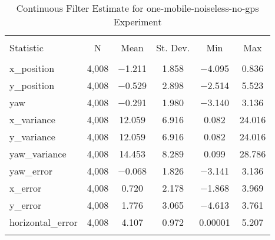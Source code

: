 
\begin{table}[h] \centering 
  \caption{Continuous Filter Estimate for one-mobile-noiseless-no-gps Experiment} 
  \label{tab:one_mobile_noiseless_no_gps_continuous_summary} 
\begin{tabular}{@{\extracolsep{5pt}}lccccc} 
\\[-1.8ex]\hline 
\hline \\[-1.8ex] 
Statistic & \multicolumn{1}{c}{N} & \multicolumn{1}{c}{Mean} & \multicolumn{1}{c}{St. Dev.} & \multicolumn{1}{c}{Min} & \multicolumn{1}{c}{Max} \\ 
\hline \\[-1.8ex] 
x\_position & 4,008 & $-$1.211 & 1.858 & $-$4.095 & 0.836 \\ 
y\_position & 4,008 & $-$0.529 & 2.898 & $-$2.514 & 5.523 \\ 
yaw & 4,008 & $-$0.291 & 1.980 & $-$3.140 & 3.136 \\ 
x\_variance & 4,008 & 12.059 & 6.916 & 0.082 & 24.016 \\ 
y\_variance & 4,008 & 12.059 & 6.916 & 0.082 & 24.016 \\ 
yaw\_variance & 4,008 & 14.453 & 8.289 & 0.099 & 28.786 \\ 
yaw\_error & 4,008 & $-$0.068 & 1.826 & $-$3.141 & 3.136 \\ 
x\_error & 4,008 & 0.720 & 2.178 & $-$1.868 & 3.969 \\ 
y\_error & 4,008 & 1.776 & 3.065 & $-$4.613 & 3.761 \\ 
horizontal\_error & 4,008 & 4.107 & 0.972 & 0.00001 & 5.207 \\ 
\hline \\[-1.8ex] 
\end{tabular} 
\end{table} 

